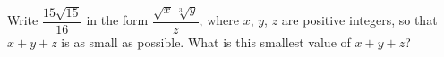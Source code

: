 Write $\dfrac{15\sqrt{15}}{16}$ in the form $\dfrac{\sqrt x\,\sqrt[3]y}{z}$, where $x$, $y$, $z$ are positive integers, so that $x+y+z$ is as small as possible. What is this smallest value of $x+y+z$?
